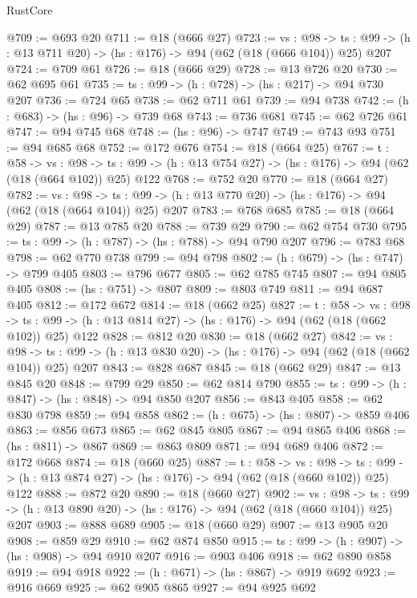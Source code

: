 \begin{lexlean}{RustCore}
\begin{coremodule}
@709 := @693 @20
@711 := @18 (@666 @27)
@723 := {vs : @98} ->
  {ts : @99} -> (h : @13 @711 @20) -> (hs : @176) -> @94 (@62 (@18 (@666 @104)) @25) @207
@724 := @709 @61
@726 := @18 (@666 @29)
@728 := @13 @726 @20
@730 := @62 @695 @61
@735 := {ts : @99} -> (h : @728) -> (hs : @217) -> @94 @730 @207
@736 := @724 @65
@738 := @62 @711 @61
@739 := @94 @738
@742 := (h : @683) -> (hs : @96) -> @739 @68
@743 := @736 @681
@745 := @62 @726 @61
@747 := @94 @745 @68
@748 := (hs : @96) -> @747
@749 := @743 @93
@751 := @94 @685 @68
@752 := @172 @676
@754 := @18 (@664 @25)
@767 := {t : @58} ->
  {vs : @98} ->
  {ts : @99} -> (h : @13 @754 @27) -> (hs : @176) -> @94 (@62 (@18 (@664 @102)) @25) @122
@768 := @752 @20
@770 := @18 (@664 @27)
@782 := {vs : @98} ->
  {ts : @99} -> (h : @13 @770 @20) -> (hs : @176) -> @94 (@62 (@18 (@664 @104)) @25) @207
@783 := @768 @685
@785 := @18 (@664 @29)
@787 := @13 @785 @20
@788 := @739 @29
@790 := @62 @754 @730
@795 := {ts : @99} -> (h : @787) -> (hs : @788) -> @94 @790 @207
@796 := @783 @68
@798 := @62 @770 @738
@799 := @94 @798
@802 := (h : @679) -> (hs : @747) -> @799 @405
@803 := @796 @677
@805 := @62 @785 @745
@807 := @94 @805 @405
@808 := (hs : @751) -> @807
@809 := @803 @749
@811 := @94 @687 @405
@812 := @172 @672
@814 := @18 (@662 @25)
@827 := {t : @58} ->
  {vs : @98} ->
  {ts : @99} -> (h : @13 @814 @27) -> (hs : @176) -> @94 (@62 (@18 (@662 @102)) @25) @122
@828 := @812 @20
@830 := @18 (@662 @27)
@842 := {vs : @98} ->
  {ts : @99} -> (h : @13 @830 @20) -> (hs : @176) -> @94 (@62 (@18 (@662 @104)) @25) @207
@843 := @828 @687
@845 := @18 (@662 @29)
@847 := @13 @845 @20
@848 := @799 @29
@850 := @62 @814 @790
@855 := {ts : @99} -> (h : @847) -> (hs : @848) -> @94 @850 @207
@856 := @843 @405
@858 := @62 @830 @798
@859 := @94 @858
@862 := (h : @675) -> (hs : @807) -> @859 @406
@863 := @856 @673
@865 := @62 @845 @805
@867 := @94 @865 @406
@868 := (hs : @811) -> @867
@869 := @863 @809
@871 := @94 @689 @406
@872 := @172 @668
@874 := @18 (@660 @25)
@887 := {t : @58} ->
  {vs : @98} ->
  {ts : @99} -> (h : @13 @874 @27) -> (hs : @176) -> @94 (@62 (@18 (@660 @102)) @25) @122
@888 := @872 @20
@890 := @18 (@660 @27)
@902 := {vs : @98} ->
  {ts : @99} -> (h : @13 @890 @20) -> (hs : @176) -> @94 (@62 (@18 (@660 @104)) @25) @207
@903 := @888 @689
@905 := @18 (@660 @29)
@907 := @13 @905 @20
@908 := @859 @29
@910 := @62 @874 @850
@915 := {ts : @99} -> (h : @907) -> (hs : @908) -> @94 @910 @207
@916 := @903 @406
@918 := @62 @890 @858
@919 := @94 @918
@922 := (h : @671) -> (hs : @867) -> @919 @692
@923 := @916 @669
@925 := @62 @905 @865
@927 := @94 @925 @692

\end{coremodule}
\end{lexlean}
